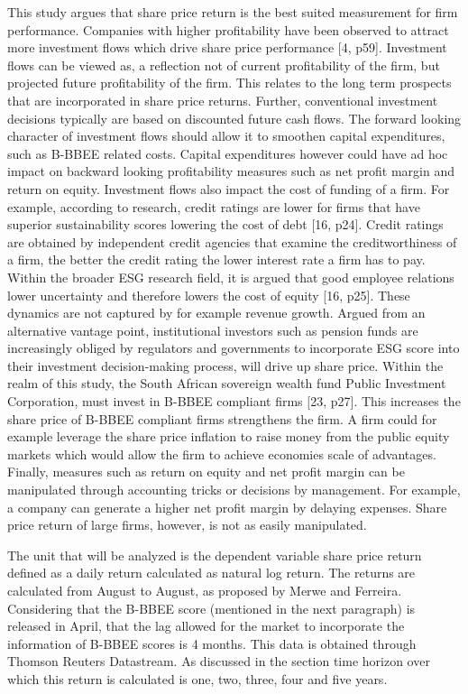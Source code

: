 This study argues that share price return is the best suited measurement for firm performance. Companies with higher profitability have been observed to attract more investment flows which drive share price performance [4, p59]. Investment flows can be viewed as, a reflection not of current profitability of the firm, but projected future profitability of the firm. This relates to the long term prospects that are incorporated in share price returns. Further, conventional investment decisions typically are based on discounted future cash flows. The forward looking character of investment flows should allow it to smoothen capital expenditures, such as B-BBEE related costs. Capital expenditures however could have ad hoc impact on backward looking profitability measures such as net profit margin and return on equity. Investment flows also impact the cost of funding of a firm. For example, according to research, credit ratings are lower for firms that have superior sustainability scores lowering the cost of debt [16, p24]. Credit ratings are obtained by independent credit agencies that examine the creditworthiness of a firm, the better the credit rating the lower interest rate a firm has to pay. Within the broader ESG research field, it is argued that good employee relations lower uncertainty and therefore lowers the cost of equity [16, p25]. These dynamics are not captured by for example revenue growth. Argued from an alternative vantage point, institutional investors such as pension funds are increasingly obliged by regulators and governments to incorporate ESG score into their investment decision-making process, will drive up share price. Within the realm of this study, the South African sovereign wealth fund Public Investment Corporation, must invest in B-BBEE compliant firms [23, p27]. This increases the share price of B-BBEE compliant firms strengthens the firm. A firm could for example leverage the share price inflation to raise money from the public equity markets which would allow the firm to achieve economies scale of advantages. Finally, measures such as return on equity and net profit margin can be manipulated through accounting tricks or decisions by management. For example, a company can generate a higher net profit margin by delaying expenses. Share price return of large firms, however, is not as easily manipulated.

The unit that will be analyzed is the dependent variable share price return defined as a daily return calculated as natural log return. The returns are calculated from August to August, as proposed by Merwe and Ferreira. Considering that the B-BBEE score (mentioned in the next paragraph) is released in April, that the lag allowed for the market to incorporate the information of B-BBEE scores is 4 months. This data is obtained through Thomson Reuters Datastream. As discussed in the section time horizon over which this return is calculated is one, two, three, four and five years.

